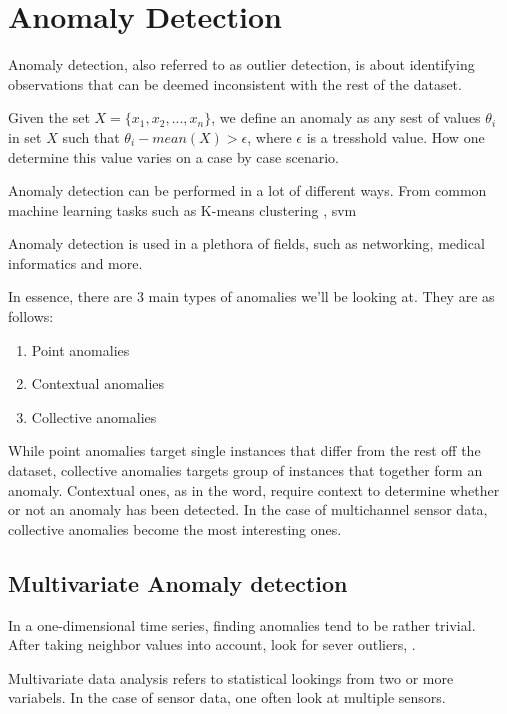 \section{Anomaly Detection}
\label{back:anomdet}

Anomaly detection, also referred to as outlier detection, is about identifying observations that can be deemed inconsistent with the rest of the dataset.  

Given the set $X = \{x_1, x_2, ..., x_n\}$, we define an anomaly as any sest of values $\theta_i$ in set $X$ such that $\theta_i - mean(X) > \epsilon$, where $\epsilon$ is a tresshold value. How one determine this value varies on a case by case scenario.

Anomaly detection can be performed in a lot of different ways. From common machine learning tasks such as K-means clustering \cite{7507933}, \Gls{svm} \cite{10.1007/978-3-540-28647-9_97}

Anomaly detection is used in a plethora of fields, such as networking, medical informatics and more. 

In essence, there are 3 main types of anomalies we'll be looking at. They are as follows:

\begin{enumerate}
    \item Point anomalies 
    \item Contextual anomalies 
    \item Collective anomalies
\end{enumerate}

While point anomalies target single instances that differ from the rest off the dataset, collective anomalies targets group of instances that together form an anomaly. Contextual ones, as in the word, require context to determine whether or not an anomaly has been detected. In the case of multichannel sensor data, collective anomalies become the most interesting ones. 


\subsection{Multivariate Anomaly detection}

In a one-dimensional time series, finding anomalies tend to be rather trivial. After taking neighbor values into account, look for sever outliers, .

Multivariate data analysis refers to statistical lookings from two or more variabels. In the case of sensor data, one often look at multiple sensors. 

